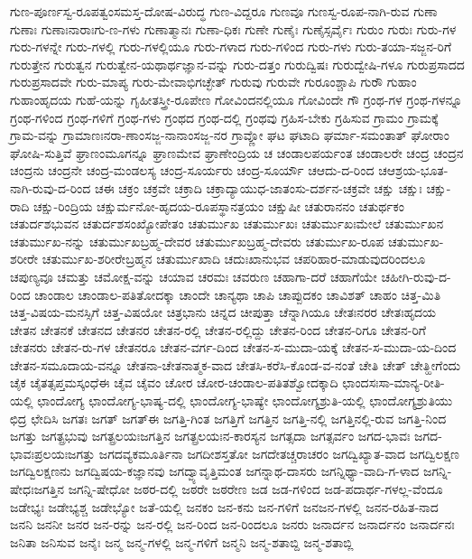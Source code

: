 {ಗುಣ-ಪೂರ್ಣಸ್ವ-ರೂಪತ್ವಂಸಮಸ್ತ-ದೋಷ-ವಿರುದ್ಧ
ಗುಣ-ವಿದ್ದರೂ
ಗುಣವೂ
ಗುಣಸ್ವ-ರೂಪ-ನಾಗಿ-ರುವ
ಗುಣಾ
ಗುಣಾಃ
ಗುಣಾಃನಾರಾಃಗು-ಣ-ಗಳು
ಗುಣಾತ್ಮಾನಃ
ಗುಣಾ-ಧಿಕಃ
ಗುಣೇ
ಗುಣೈಃ
ಗುಣೈಸ್ಸರ್ವೈಃ
ಗುರುಂ
ಗುರುಃ
ಗುರು-ಗಳ
ಗುರು-ಗಳನ್ನೇ
ಗುರು-ಗಳಲ್ಲಿ
ಗುರು-ಗಳಲ್ಲಿಯೂ
ಗುರು-ಗಳಾದ
ಗುರು-ಗಳಿಂದ
ಗುರು-ಗಳು
ಗುರು-ತಯಾ-ಸಜ್ಜನ-ರಿಗೆ
ಗುರುತ್ತೇನ
ಗುರುತ್ವನ
ಗುರುತ್ವೇನ-ಯಥಾರ್ಥಜ್ಞಾನ-ವನ್ನು
ಗುರು-ದತ್ತಂ
ಗುರುದ್ವಿಷಃ
ಗುರುದ್ವೇಷಿ-ಗಳೂ
ಗುರುಪ್ರಸಾದದ
ಗುರುಪ್ರಸಾದವೇ
ಗುರು-ಮಾಪ್ಯ
ಗುರು-ಮೇವಾಭಿಗಚ್ಛೇತ್
ಗುರುವು
ಗುರುವೇ
ಗುರೂಂಶ್ಚಾಪಿ
ಗುರೌ
ಗುಹಾಂ
ಗುಹಾಂಹೃದಯ
ಗುಹೆ-ಯನ್ನು
ಗೃಹೀತಸ್ತ್ರೀ-ರೂಪೇಣ
ಗೋವಿಂದನಲ್ಲಿಯೂ
ಗೋವಿಂದೇ
ಗೌ
ಗ್ರಂಥ-ಗಳ
ಗ್ರಂಥ-ಗಳನ್ನೂ
ಗ್ರಂಥ-ಗಳಿಂದ
ಗ್ರಂಥ-ಗಳಿಗೆ
ಗ್ರಂಥ-ಗಳು
ಗ್ರಂಥದ
ಗ್ರಂಥ-ದಲ್ಲಿ
ಗ್ರಂಥವು
ಗ್ರಹಿಸ-ಬೇಕು
ಗ್ರಹಿಸುವ
ಗ್ರಾಮಂ
ಗ್ರಾಮಕ್ಕೆ
ಗ್ರಾಮ-ವನ್ನು
ಗ್ರಾಮಾಣಃನರಾ-ಣಾಂಸಜ್ಜ-ನಾನಾಂಸಜ್ಜ-ನರ
ಗ್ರಾವ್ಣೋ
ಘಟ
ಘಟಾದಿ
ಘರ್ಮಾ-ಸಮಂತಾತ್
ಘೋರಾಂ
ಘೋಷಿ-ಸುತ್ತಿವೆ
ಘ್ರಾಣಂಮೂಗನ್ನೂ
ಘ್ರಾಣಮೇವ
ಘ್ರಾಣೇಂದ್ರಿಯ
ಚ
ಚಂಡಾಲಪರ್ಯಂತ
ಚಂಡಾಲರೇ
ಚಂದ್ರ
ಚಂದ್ರನ
ಚಂದ್ರನು
ಚಂದ್ರನೇ
ಚಂದ್ರ-ಮಂಡಲಸ್ಯ
ಚಂದ್ರ-ಸೂರ್ಯರು
ಚಂದ್ರ-ಸೂರ್ಯೌ
ಚಆದು-ದ-ರಿಂದ
ಚಆಶ್ರಯ-ಭೂತ-ನಾಗಿ-ರುವು-ದ-ರಿಂದ
ಚಈ
ಚಕ್ರಂ
ಚಕ್ರವೇ
ಚಕ್ರಾದಿ
ಚಕ್ರಾದ್ಯಾಯುಧ-ಜಾತಂಸು-ದರ್ಶನ-ಚಕ್ರವೇ
ಚಕ್ಷು
ಚಕ್ಷುಃ
ಚಕ್ಷು-ರಾದಿ
ಚಕ್ಷು-ರಿಂದ್ರಿಯ
ಚಕ್ಷುರ್ಮನೋ-ಹೃದಯ-ರೂಪಸ್ಥಾನತ್ರಯಂ
ಚಕ್ಷುಷೀ
ಚತುರಾನನಂ
ಚತುರ್ಥಕಂ
ಚತುರ್ದಶಭುವನ
ಚತುರ್ದಶಸಂಖ್ಯೋಪೇತಂ
ಚತುರ್ಮುಖ
ಚತುರ್ಮುಖಃ
ಚತುರ್ಮುಖಃಮೇಲೆ
ಚತುರ್ಮುಖನ
ಚತುರ್ಮುಖ-ನನ್ನು
ಚತುರ್ಮುಖಬ್ರಹ್ಮ-ದೇವರ
ಚತುರ್ಮುಖಬ್ರಹ್ಮ-ದೇವರು
ಚತುರ್ಮುಖ-ರೂಪ
ಚತುರ್ಮುಖ-ಶರೀರೇ
ಚತುರ್ಮುಖ-ಶರೀರೇಬ್ರಹ್ಮನ
ಚತುರ್ಮುಖಾದಿ
ಚದುಃಖಾನುಭವ
ಚಪರಿಹಾರ-ಮಾಡುವುದರಿಂದಲೂ
ಚಪುಣ್ಯವೂ
ಚಮತ್ತು
ಚಮೋಕ್ಷ-ವನ್ನು
ಚಯಾವ
ಚರಮಃ
ಚವರುಣ
ಚಹಾಗಾ-ದರೆ
ಚಹಾಗೆಯೇ
ಚಹೀಗಿ-ರುವು-ದ-ರಿಂದ
ಚಾಂಡಾಲ
ಚಾಂಡಾಲ-ಪತಿತೋದಕ್ಕಾ
ಚಾಂದೇ
ಚಾನ್ಯಥಾ
ಚಾಪಿ
ಚಾಪ್ಪುದಕಂ
ಚಾವಿಶತ್
ಚಾಹಂ
ಚಿತ್ತ-ಮಿತಿ
ಚಿತ್ತ-ವಿಷಯ-ಮನಸ್ಸಿಗೆ
ಚಿತ್ತ-ವಿಷಯೋ
ಚಿತ್ರಭಾನು
ಚಿನ್ನದ
ಚೀಪುತ್ತಾ
ಚೆನ್ನಾಗಿಯೂ
ಚೇತಃನರರ
ಚೇತಃಹೃದಯ
ಚೇತನ
ಚೇತನಕೆ
ಚೇತನದ
ಚೇತನರ
ಚೇತನ-ರಲ್ಲಿ
ಚೇತನ-ರಲ್ಲಿದ್ದು
ಚೇತನ-ರಿಂದ
ಚೇತನ-ರಿಗೂ
ಚೇತನ-ರಿಗೆ
ಚೇತನರು
ಚೇತನ-ರು-ಗಳ
ಚೇತನರೂ
ಚೇತನ-ವರ್ಗ-ದಿಂದ
ಚೇತನ-ಸ-ಮುದಾ-ಯಕ್ಕೆ
ಚೇತನ-ಸ-ಮುದಾ-ಯ-ದಿಂದ
ಚೇತನ-ಸಮೂದಾಯ-ವನ್ನೂ
ಚೇತನಾ-ಚೇತನಾತ್ಮಕ-ವಾದ
ಚೇತಸಿ-ಕರೆಸಿ-ಕೊಂಡ-ವ-ನಂತೆ
ಚೇತಿ
ಚೇತ್
ಚೇತ್ಹೀಗೆಂದು
ಚೈಕ
ಚೈತತ್ಸಪ್ತಮಸ್ಕಂಧೆಈ
ಚೈವ
ಚೈವಂ
ಚೋರ
ಚೋರ-ಚಂಡಾಲ-ಪತಿತಶ್ವೋದಕ್ಕಾದಿ
ಛಾಂದಸಃಸಾ-ಮಾನ್ಯ-ರೀತಿ-ಯಲ್ಲಿ
ಛಾಂದೋಗ್ಯ
ಛಾಂದೋಗ್ಯ-ಭಾಷ್ಯ-ದಲ್ಲಿ
ಛಾಂದೋಗ್ಯ-ಭಾಷ್ಯೇ
ಛಾಂದೋಗ್ಯಶ್ರುತಿ-ಯಲ್ಲಿ
ಛಾಂದೋಗ್ಯಶ್ರುತಿಯು
ಛಿದ್ರ
ಛೇದಿಸಿ
ಜಗತಃ
ಜಗತ್
ಜಗತ್ಈ
ಜಗತ್ತಿ-ಗಿಂತ
ಜಗತ್ತಿಗೆ
ಜಗತ್ತಿನ
ಜಗತ್ತಿ-ನಲ್ಲಿ
ಜಗತ್ತಿನಲ್ಲಿ-ರುವ
ಜಗತ್ತಿ-ನಿಂದ
ಜಗತ್ತು
ಜಗತ್ಪ್ರಭುವು
ಜಗತ್ಪ್ರಲಯಃಜಗತ್ತಿನ
ಜಗತ್ಪ್ರಲಯಃನ-ಕಾರಸ್ಯನ
ಜಗತ್ಸದಾ
ಜಗತ್ಸರ್ವಂ
ಜಗದ-ಭಾವಃ
ಜಗದ-ಭಾವಃಪ್ರಲಯಃಜಗತ್ತು
ಜಗದವ್ಯಕಮೂರ್ತಿನಾ
ಜಗದೀಶಸ್ತತೋ
ಜಗದೇತಚ್ಚರಾಚರಂ
ಜಗದ್ವಿಖ್ಯಾತ-ವಾದ
ಜಗದ್ವಿಲಕ್ಷಣ
ಜಗದ್ವಿಲಕ್ಷಣನು
ಜಗದ್ವಿಷಯ-ಕಜ್ಞಾನವು
ಜಗದ್ವ್ಯಾವೃತ್ತಿಮಂತ
ಜಗನ್ನಾಥ-ದಾಸರು
ಜಗನ್ನಿಥ್ಯಾ-ವಾದಿ-ಗ-ಳಾದ
ಜಗನ್ನಿ-ಷೇಧಃಜಗತ್ತಿನ
ಜಗನ್ನಿ-ಷೇಧೋ
ಜಠರ-ದಲ್ಲಿ
ಜಠರೇ
ಜಠರೇಣ
ಜಡ
ಜಡ-ಗಳಿಂದ
ಜಡ-ಪದಾರ್ಥ-ಗಳಲ್ಲ-ವೆಂದೂ
ಜಡೇಭ್ಯಃ
ಜಡೇಭ್ಯಶ್ಚ
ಜಡೇಭ್ಯೋ
ಜತೆ-ಯಲ್ಲಿ
ಜನಕಂ
ಜನ-ಕನು
ಜನ-ಗಳಿಗೆ
ಜನಜನ-ಗಳಲ್ಲಿ
ಜನನ-ರಹಿತ-ನಾದ
ಜನನಿ
ಜನನೀ
ಜನರ
ಜನ-ರನ್ನು
ಜನ-ರಲ್ಲಿ
ಜನ-ರಿಂದ
ಜನ-ರಿಂದಲೂ
ಜನರು
ಜನಾರ್ದನ
ಜನಾರ್ದನಂ
ಜನಾರ್ದನಃ
ಜನಿತಾ
ಜನಿಸುವ
ಜನೈಃ
ಜನ್ಮ
ಜನ್ಮ-ಗಳಲ್ಲಿ
ಜನ್ಮ-ಗಳಿಗೆ
ಜನ್ಮನಿ
ಜನ್ಮ-ಶತಾಬ್ದಿ
ಜನ್ಮ-ಶತಾಬ್ಲಿ
}
